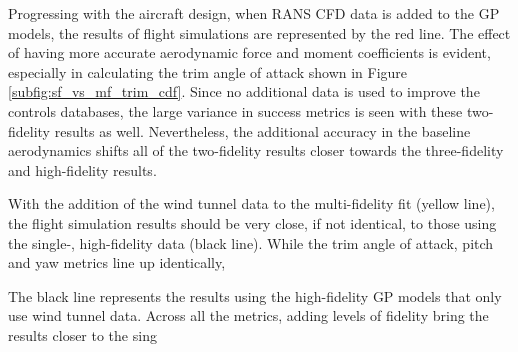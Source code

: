 Progressing with the aircraft design, when RANS CFD data is added to the GP models, the results of flight simulations are represented by the red line. 
The effect of having more accurate aerodynamic force and moment coefficients is evident, especially in calculating the trim angle of attack shown in Figure \ref{subfig:sf_vs_mf_trim_cdf}.
Since no additional data is used to improve the controls databases, the large variance in success metrics is seen with these two-fidelity results as well. 
Nevertheless, the additional accuracy in the baseline aerodynamics shifts all of the two-fidelity results closer towards the three-fidelity and high-fidelity results.

With the addition of the wind tunnel data to the multi-fidelity fit (yellow line), the flight simulation results should be very close, if not identical, to those using the single-, high-fidelity data (black line). 
While the trim angle of attack, pitch and yaw metrics line up identically,



The black line represents the results using the high-fidelity GP models that only use wind tunnel data. 
Across all the metrics, adding levels of fidelity bring the results closer to the sing
